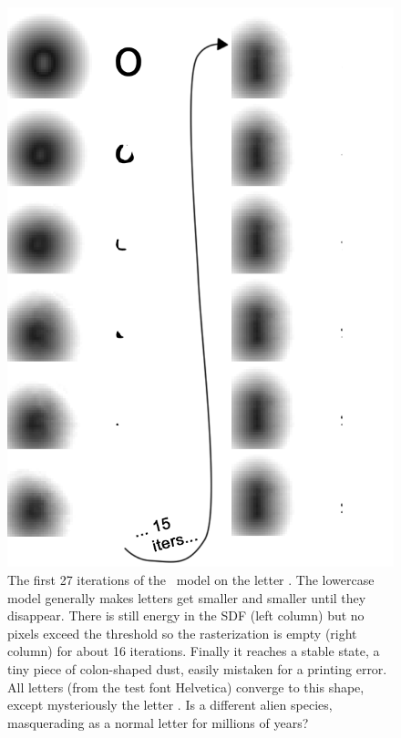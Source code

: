 \documentclass[twocolumn]{article}
\begin{document}
\begin{figure}[t]
\centering
  \includegraphics[width=0.80 \linewidth]{lowestcaseo}
  \caption{ The first 27 iterations of the \makelowercase\ model on
    the letter . The lowercase model generally makes
    letters get smaller and smaller until they disappear. There is
    still energy in the SDF (left column) but no pixels exceed the
    threshold so the rasterization is empty (right column) for about
    16 iterations. Finally it reaches a stable state, a tiny piece of
    colon-shaped dust, easily mistaken for a printing error. All
    letters (from the test font Helvetica) converge to this shape,
    except mysteriously the letter . Is  a
    different alien species, masquerading as a normal letter for
    millions of years? } \label{fig:lowestcaseo}
\end{figure}



\end{document}

